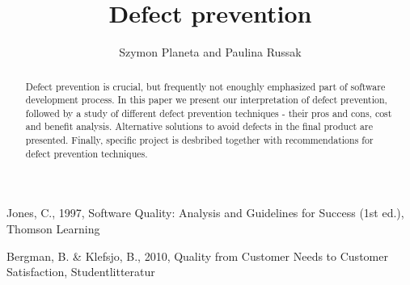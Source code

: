 \documentclass[letterpaper, 10 pt, conference]{ieeeconf}  %
\title{\LARGE \bf
Defect prevention}
\author{Szymon Planeta and Paulina Russak%
}
\begin{document}
\maketitle
\thispagestyle{empty}
\pagestyle{empty}


\begin{abstract}

	Defect prevention is crucial, but frequently not enoughly emphasized part of software development process. In this paper we present our interpretation of defect prevention, followed by a study of different defect prevention techniques - their pros and cons, cost and benefit analysis. Alternative solutions to avoid defects in the final product are presented. Finally, specific project is desbribed together with recommendations for defect prevention techniques.

\end{abstract}








\begin{thebibliography}{99}

 Jones, C., 1997, Software Quality: Analysis and Guidelines for Success (1st ed.), Thomson Learning

 Bergman, B. \& Klefsjo, B., 2010, Quality from Customer Needs to Customer Satisfaction, Studentlitteratur
 







\end{thebibliography}
\end{document}
